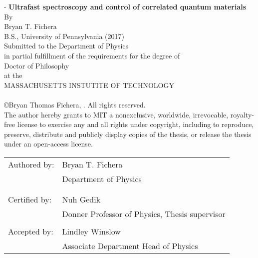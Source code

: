 \begin{titlingpage*}
\calccentering{\unitlength}
\begin{adjustwidth*}{\unitlength}{-\unitlength}
\centering
{\Large\bfseries Ultrafast spectroscopy and control of correlated quantum materials}\\[0.5\baselineskip]
{By}\\[0.5\baselineskip]
{\large Bryan T. Fichera\\[0.5\baselineskip]}
{B.S., University of Pennsylvania (2017)\\[0.5\baselineskip]
Submitted to the Department of Physics\\ in partial fulfillment of the requirements for the degree of\\[0.5\baselineskip]
{\large Doctor of Philosophy\\[0.5\baselineskip]}
at the\\[0.5\baselineskip]
{\large MASSACHUSETTS INSTUTITE OF TECHNOLOGY\\[0.5\baselineskip]}
\\[0.5\baselineskip]}
\copyright Bryan Thomas Fichera, . All rights reserved.\\[0.5\baselineskip]
The author hereby grants to MIT a nonexclusive, worldwide, irrevocable, royalty-free license to exercise any and all rights under copyright, including to reproduce, preserve, distribute and publicly display copies of the thesis, or release the thesis under an open-access license.\\[2\baselineskip]
\flushleft
\begin{tabularx}{\textwidth}{ll}
Authored by: & Bryan T. Fichera\\
& Department of Physics\\
& \\
\\
Certified by: & Nuh Gedik\\
& Donner Professor of Physics, Thesis supervisor\\
\\
Accepted by: & Lindley Winslow\\
& Associate Department Head of Physics\\
\end{tabularx}
\end{adjustwidth*}
\end{titlingpage*}
